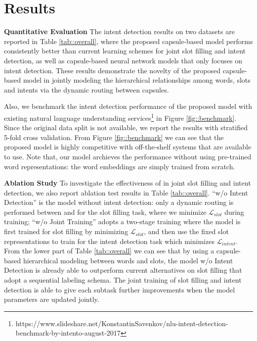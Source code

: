\section{Results}
\noindent\textbf{Quantitative Evaluation} The intent detection results on two datasets are reported in Table \ref{tab::overall}, where the proposed capsule-based model performs consistently better than current learning schemes for joint slot filling and intent detection, as well as capsule-based neural network models that only focuses on intent detection. These results demonstrate the novelty of the proposed capsule-based model {\ModelName} in jointly modeling the hierarchical relationships among words, slots and intents via the dynamic routing between capsules.

Also, we benchmark the intent detection performance of the proposed model with existing natural language understanding services\footnote{https://www.slideshare.net/KonstantinSavenkov/nlu-intent-detection-benchmark-by-intento-august-2017} in Figure \ref{fig::benchmark}.
Since the original data split is not available, we report the results with stratified 5-fold cross validation. From Figure \ref{fig::benchmark} we can see that the proposed model {\ModelName} is highly competitive with off-the-shelf systems that are available to use. Note that, our model archieves the performance without using pre-trained word representations: the word embeddings are simply trained from scratch.

\noindent\textbf{Ablation Study}
To investigate the effectiveness of {\ModelName} in joint slot filling and intent detection, we also report ablation test results in Table \ref{tab::overall}. ``w/o Intent Detection'' is the model without intent detection: only a dynamic routing is performed between {\FirstCapsule} and {\SecondCapsule} for the slot filling task, where we minimize $\mathcal{L}_{slot}$ during training; ``w/o Joint Training'' adopts a two-stage training where the model is first trained for slot filling by minimizing $\mathcal{L}_{slot}$, and then use the fixed slot representations to train for the intent detection task which minimizes $\mathcal{L}_{intent}$. From the lower part of Table \ref{tab::overall} we can see that by using a capsule-based hierarchical modeling between words and slots, the model {\ModelName} w/o Intent Detection is already able to outperform current alternatives on slot filling that adopt a sequential labeling schema. The joint training of slot filling and intent detection is able to give each subtask further improvements when the model parameters are updated jointly.

